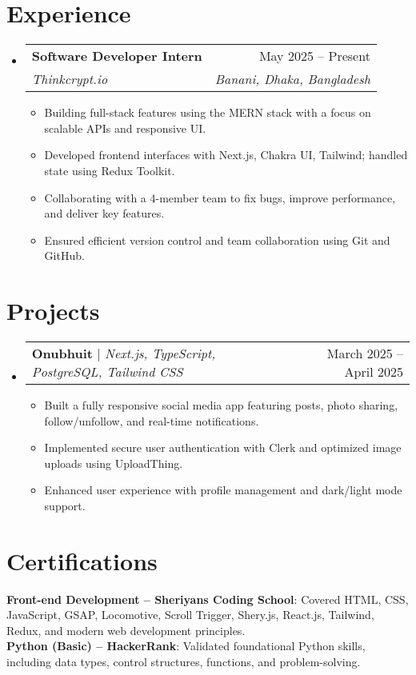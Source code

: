 \documentclass[a4paper,11pt]{article}
\makeatletter
\newcommand{\resumeItem}[1]{
  \item\small{
    {#1 \vspace{-2pt}}
  }
}
\newcommand{\resumeSubheading}[4]{
  \vspace{-2pt}\item
    \begin{tabular*}{0.97\textwidth}[t]{l@{\extracolsep{\fill}}r}
      \textbf{#1} & #2 \\
      \textit{\small#3} & \textit{\small #4} \\
    \end{tabular*}\vspace{-7pt}
}
\newcommand{\resumeProjectHeading}[2]{
    \item
    \begin{tabular*}{0.97\textwidth}{l@{\extracolsep{\fill}}r}
      \small#1 & #2 \\
    \end{tabular*}\vspace{-7pt}
}
\newcommand{\resumeSubHeadingListStart}{\begin{itemize}[leftmargin=0.15in, label={}]}
\newcommand{\resumeSubHeadingListEnd}{\end{itemize}}
\newcommand{\resumeItemListStart}{\begin{itemize}}
\newcommand{\resumeItemListEnd}{\end{itemize}\vspace{-5pt}}
\makeatother
\begin{document}
\section{Experience}
  \resumeSubHeadingListStart
    \resumeSubheading
      {Software Developer Intern}{May 2025 -- Present}
      {Thinkcrypt.io}{Banani, Dhaka, Bangladesh }
      \resumeItemListStart
        \resumeItem{Building full-stack features using the MERN stack with a focus on scalable APIs and responsive UI.}
        \resumeItem{Developed frontend interfaces with Next.js, Chakra UI, Tailwind; handled state using Redux Toolkit.}
        \resumeItem{Collaborating with a 4-member team to fix bugs, improve performance, and deliver key features.}
        \resumeItem{Ensured efficient version control and team collaboration using Git and GitHub.}
      \resumeItemListEnd
  \resumeSubHeadingListEnd


\section{Projects}
  \resumeSubHeadingListStart
    \resumeProjectHeading
        {\textbf{Onubhuit} $|$ \emph{Next.js, TypeScript, PostgreSQL, Tailwind CSS}}{March 2025 -- April 2025}
        \resumeItemListStart
          \resumeItem{Built a fully responsive social media app featuring posts, photo sharing, follow/unfollow, and real-time notifications.}
          \resumeItem{Implemented secure user authentication with Clerk and optimized image uploads using UploadThing.}
          \resumeItem{Enhanced user experience with profile management and dark/light mode support.}
        \resumeItemListEnd
  \resumeSubHeadingListEnd

\section{Certifications}
  \begin{itemize}[leftmargin=0.15in, label={}]
    \small{\item{
      \textbf{Front-end Development – Sheriyans Coding School}{: Covered HTML, CSS, JavaScript, GSAP, Locomotive, Scroll Trigger, Shery.js, React.js, Tailwind, Redux, and modern web development principles.} \\
      \textbf{Python (Basic) – HackerRank}{: Validated foundational Python skills, including data types, control structures, functions, and problem-solving.}
    }}
  \end{itemize}
\end{document}

